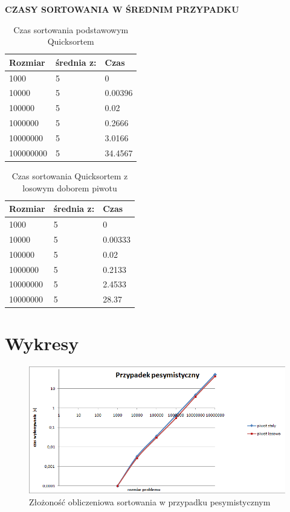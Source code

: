 \documentclass[10pt,oneside]{mwbk}
\begin{document}
	
	\newpage
	\textbf{CZASY SORTOWANIA W ŚREDNIM PRZYPADKU}
	\\
	
	\begin{table}[!h]
	\centering
	\begin{tabular}{| l | l | l |}
	\hline
	Rozmiar & średnia z: & Czas         \\ \hline 
1000&5&0\\ \hline
10000&5&0.00396\\ \hline
100000&5&0.02\\ \hline
1000000&5&0.2666\\ \hline
10000000&5&3.0166\\ \hline
100000000&5&34.4567\\ \hline
	\end{tabular}
		\caption{Czas sortowania podstawowym Quicksortem}
	\end{table}
	

	\begin{table}[!h]
	\centering
	\begin{tabular}{| l | l | l |}
	\hline
		Rozmiar & średnia z: & Czas         \\ \hline
1000&5&0\\ \hline
10000&5&0.00333\\ \hline
100000&5&0.02\\ \hline
1000000&5&0.2133\\ \hline
10000000&5&2.4533\\ \hline
10000000&5&28.37\\ \hline
	\end{tabular}
	\caption{Czas sortowania Quicksortem z losowym doborem piwotu}
	\end{table}
\newpage
\section {Wykresy}
	\begin{figure}[!h]

	\includegraphics[scale=0.6]{rys/przypadek_pesymistyczny.png}
	\caption{ Złożoność obliczeniowa sortowania w przypadku pesymistycznym}

	\end{figure}
	
\end{document}
